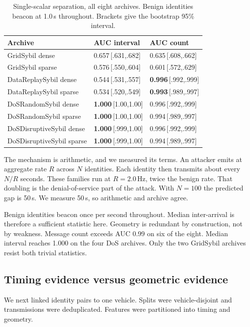 \documentclass[conference]{IEEEtran}
\begin{document}
\begin{table}[t]
\caption{Single-scalar separation, all eight archives.
Benign identities beacon at 1.0\,s throughout.
Brackets give the bootstrap 95\% interval.}
\label{tab:scalar}
\centering
\footnotesize
\begin{tabular}{lll}
\toprule
Archive & AUC interval & AUC count \\
\midrule
GridSybil dense           & 0.657\,[.631,.682] & 0.635\,[.608,.662] \\
GridSybil sparse          & 0.576\,[.550,.604] & 0.601\,[.572,.629] \\
DataReplaySybil dense     & 0.544\,[.531,.557] & \textbf{0.996}\,[.992,.999] \\
DataReplaySybil sparse    & 0.534\,[.520,.549] & \textbf{0.993}\,[.989,.997] \\
DoSRandomSybil dense      & \textbf{1.000}\,[1.00,1.00] & 0.996\,[.992,.999] \\
DoSRandomSybil sparse     & \textbf{1.000}\,[1.00,1.00] & 0.994\,[.989,.997] \\
DoSDisruptiveSybil dense  & \textbf{1.000}\,[.999,1.00] & 0.996\,[.992,.999] \\
DoSDisruptiveSybil sparse & \textbf{1.000}\,[.999,1.00] & 0.994\,[.989,.997] \\
\bottomrule
\end{tabular}
\end{table}

The mechanism is arithmetic, and we measured its terms.
An attacker emits at aggregate rate $R$ across $N$ identities.
Each identity then transmits about every $N/R$ seconds.
These families run at $R=2.0$\,Hz, twice the benign rate.
That doubling is the denial-of-service part of the attack.
With $N=100$ the predicted gap is 50\,s.
We measure 50\,s, so arithmetic and archive agree.

Benign identities beacon once per second throughout.
Median inter-arrival is therefore a sufficient statistic here.
Geometry is redundant by construction, not by weakness.
Message count exceeds AUC 0.99 on six of the eight.
Median interval reaches 1.000 on the four DoS archives.
Only the two GridSybil archives resist both trivial statistics.

\subsection{Timing evidence versus geometric evidence}

We next linked identity pairs to one vehicle.
Splits were vehicle-disjoint and transmissions were deduplicated.
Features were partitioned into timing and geometry.
\end{document}
